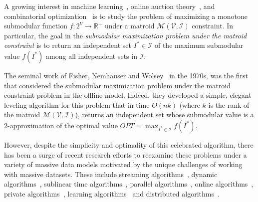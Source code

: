 \documentclass[11pt]{article}
\newcommand{\REAL}{\ensuremath{\mathbb{R}}}
\newcommand{\matroid}{\mathcal{M}(\ground,\mathcal{I})}
\newcommand{\ground}{\ensuremath{\mathcal{V}}}
\begin{document}
A growing interest in machine learning~\cite{DBLP:journals/spm/TohidiACGLK20,DBLP:conf/nips/HanCCW20,DBLP:conf/nips/ElenbergDFK17,DBLP:conf/bmvc/Krause13,DBLP:conf/icml/BateniCEFMR19,DBLP:conf/acl/LinB11,DBLP:conf/cikm/SiposSSJ12,DBLP:conf/kdd/El-AriniG11,DBLP:conf/wsdm/AgrawalGHI09,DBLP:conf/icml/WeiIB15,DBLP:conf/iccv/DueckF07}, online auction theory~\cite{DBLP:journals/talg/BateniHZ13,DBLP:conf/wine/GuptaRST10,DBLP:journals/jacm/BabaioffIKK18,DBLP:conf/stoc/KleinbergW12,DBLP:journals/algorithmica/GharanV13,DBLP:journals/geb/KleinbergW19,DBLP:journals/jacm/BabaioffIKK18,DBLP:conf/stoc/KleinbergW12,DBLP:conf/soda/EhsaniHKS18}, and 
combinatorial optimization~\cite{DBLP:journals/mor/LeeSV10,DBLP:conf/soda/ChekuriVZ11,DBLP:conf/stoc/LeeSV10,DBLP:journals/toc/KempeKT15,DBLP:conf/uai/KvetonWAEE14,DBLP:books/ph/PapadimitriouS82,DBLP:journals/jcp/MagosMP06}
is to study the problem of maximizing a monotone submodular function $f: 2^{V} \rightarrow \REAL^+$ under a matroid $\matroid$ constraint. 
In particular, the goal in the \emph{submodular maximization problem under the matroid constraint} is to 
return an independent set $I^* \in \mathcal{I}$ 
of the maximum submodular value $f(I^*) $ among all independent sets in $\mathcal{I}$. 


The seminal work of Fisher, Nemhauser and Wolsey~\cite{DBLP:journals/mp/NemhauserWF78} in the 1970s,
was the first that considered the submodular maximization problem under the matroid constraint problem in the offline model. 
Indeed, they developed a simple, elegant leveling algorithm for this problem that 
in time $O(nk)$ (where $k$ is the rank of the matroid $\matroid$), 
returns an independent set whose submodular value is a $2$-approximation of 
the optimal value $OPT = \max_{I^* \in \mathcal{I}} f(I^*)$.


However, despite the simplicity and optimality of this celebrated algorithm, 
there has been a surge of recent research efforts to
reexamine these problems under a variety of massive data models motivated by the unique challenges of
working with massive datasets. These include streaming 
algorithms~\cite{DBLP:conf/kdd/BadanidiyuruMKK14,DBLP:conf/stoc/FeldmanNSZ20,DBLP:conf/icalp/AlalufEFNS20,DBLP:conf/icml/0001MZLK19}, 
dynamic algorithms~\cite{DBLP:conf/icml/MirzasoleimanK017,DBLP:conf/icml/0001ZK18,DBLP:conf/nips/LattanziMNTZ20,DBLP:conf/nips/Monemizadeh20,DBLP:journals/corr/abs-2111-03198}, 
sublinear time algorithms~\cite{DBLP:conf/icml/StanZ0K17}, parallel
algorithms~\cite{DBLP:conf/nips/KupferQBS20,DBLP:conf/stoc/BalkanskiS18,DBLP:conf/icml/BalkanskiS18,DBLP:conf/icml/EneN20,DBLP:conf/soda/EneN19,DBLP:conf/stoc/EneNV19,DBLP:conf/stoc/ChekuriQ19}, online algorithms~\cite{DBLP:conf/nips/HarveyLS20}, 
private algorithms~\cite{DBLP:conf/aaai/ChaturvediNZ21}, learning algorithms~\cite{DBLP:conf/pkdd/BalcanH12,DBLP:conf/stoc/BalcanH11,DBLP:conf/stoc/BalkanskiRS17} and distributed algorithms~\cite{DBLP:conf/stoc/MirrokniZ15,DBLP:conf/nips/EneNV17,DBLP:conf/focs/BarbosaENW16,DBLP:conf/icml/BarbosaENW15}. 
\end{document}
